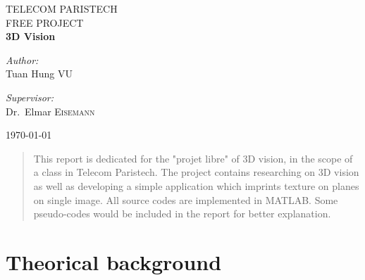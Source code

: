 \documentclass{article}
\begin{document}
\begin{titlepage}
\begin{center}
\textsc{\LARGE TELECOM PARISTECH}\\[1.5cm]
\textsc{\Large FREE PROJECT}\\[0.9cm]
{ \huge \bfseries 3D Vision}\\[1.9cm]

\begin{minipage}{0.4\textwidth}
\begin{flushleft} \large
\emph{Author:}\\
Tuan Hung \textsc{VU}
\end{flushleft}
\end{minipage}
\begin{minipage}{0.4\textwidth}
\begin{flushright} \large
\emph{Supervisor:} \\
Dr.~Elmar \textsc{Eisemann}
\end{flushright}
\end{minipage}
\vfill
{\large \today}
\end{center}
\end{titlepage}
\pagebreak{}

\thispagestyle{empty}
\begin{abstract}
This report is dedicated for the "projet libre" of 3D vision, in the scope of a class in Telecom Paristech. The project contains researching on 3D vision as well as developing a simple application which imprints texture on planes on single image. All source codes are implemented in MATLAB. Some pseudo-codes would be included in the report for better explanation. 
\end{abstract}

\pagebreak{}
\thispagestyle{empty}
\tableofcontents

\pagebreak
\setcounter{page}{1}
\section{Theorical background}
\label{sec:theo_back}
\end{document}
